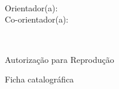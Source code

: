 \documentclass[normaltoc, espacoumemeio, pnumromarab,ruledheader]{abnt}
\renewcommand{\capa} {%
\begin{titlepage}
\makeheader
\begin{center}
\vfill
{
\Large\ABNTautordata}\\[2cm]
{\LARGE\textbf{\ABNTtitulodata}}\\[2cm]

\vfill
{\large \ABNTlocaldata \\ \ABNTdatadata}
\end{center}
\end{titlepage}}
\renewcommand{\folhaderosto}{
\begin{titlepage}
    \vfill
    \begin{center}
        {\large \ABNTautordata}\\[5cm]
        {\LARGE \textbf{\ABNTtitulodata}}\\[2cm]
        \hspace{.45\textwidth}
        \begin{minipage}{.5\textwidth}
        \begin{espacosimples}
            \begin{small}
                \ABNTcomentariodata
                \\ \\
                \\
                Orientador(a): \ABNTorientadordata
                \\
                Co-orientador(a): \ABNTcoorientadordata
            \end{small}
        \end{espacosimples}
        \end{minipage}
        \vfill
        {\large \ABNTlocaldata \\ \ABNTdatadata}
    \end{center}
\end{titlepage}
}
\begin{document}
\capa

\folhaderosto



% 


\pretextualchapter{}

\begin{center}
Autorização para Reprodução

Ficha catalográfica
\end{center}

%
%
%
%

\end{document}

